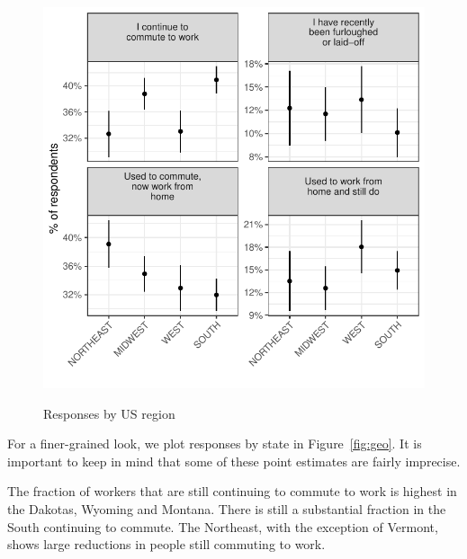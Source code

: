 \documentclass[12pt]{article}
\begin{document}
\begin{figure}
  \caption{Responses by US region} \label{fig:region}
\centering
\begin{minipage}{1.0 \linewidth}
  \includegraphics[width = \linewidth]{plots/region.pdf} \\
  \begin{footnotesize}
    \end{footnotesize}
\end{minipage}
\end{figure} 

For a finer-grained look, we plot responses by state in Figure~\ref{fig:geo}.
It is important to keep in mind that some of these point estimates are fairly imprecise.

The fraction of workers that are still continuing to commute to work is highest in the Dakotas, Wyoming and Montana.
There is still a substantial fraction in the South continuing to commute. 
The Northeast, with the exception of Vermont, shows large reductions in people still commuting to work. 
\end{document}
